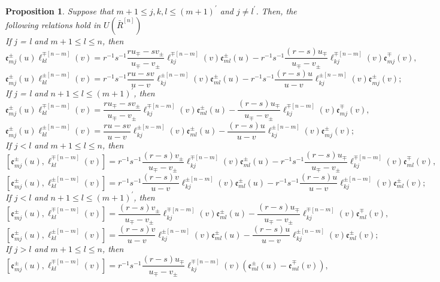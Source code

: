 \documentclass[10pt,a4paper]{amsart}
\newtheorem{proposition}[theorem]{Proposition}
\numberwithin{equation}{section}
\begin{document}
	\begin{proposition}	
		Suppose that $m+1 \leqslant j, k, l \leqslant(m+1)^{\prime}$ and $j \neq l^{\prime}$. Then, the following relations hold in $U\left(\bar{R}^{[n]}\right)$\\
		If j = l and $m+1 \leq l \leq n$, then
		$$
		\mathfrak{e}_{m j}^{ \pm}(u) \ell_{k l}^{\mp[n-m]}(v)=r^{-1} s^{-1} \frac{r u_{\mp}-s v_{ \pm}}{u_{\mp}-v_{ \pm}} \ell_{k j}^{\mp[n-m]}(v) \mathfrak{e}_{m l}^{ \pm}(u)-r^{-1} s^{-1} \frac{(r-s) u_{\mp}}{u_{\mp}-v_{ \pm}} \ell_{k j}^{\mp[n-m]}(v) \mathfrak{e}_{m j}^{\mp}(v),
		$$
		$$
		\mathfrak{e}_{m j}^{ \pm}(u) \ell_{k l}^{ \pm[n-m]}(v)=r^{-1} s^{-1} \frac{r u-s v}{u-v} \ell_{k j}^{ \pm[n-m]}(v) \mathfrak{e}_{m l}^{ \pm}(u)-r^{-1} s^{-1} \frac{(r-s) u}{u-v} \ell_{k j}^{ \pm[n-m]}(v) \mathfrak{e}_{m j}^{ \pm}(v);
		$$
		If j = l and $n+1 \leq l \leq(m+1)^{\prime}$, then
$$
\mathfrak{e}_{m j}^{ \pm}(u) \ell_{k l}^{\mp[n-m]}(v)=\frac{r u_{\mp}-s v_{ \pm}}{u_{\mp}-v_{ \pm}} \ell_{k j}^{\mp[n-m]}(v) \mathfrak{e}_{m l}^{ \pm}(u)-\frac{(r-s) u_{\mp}}{u_{\mp}-v_{ \pm}} \ell_{k j}^{\mp[n-m]}(v) \mathfrak{e}_{m j}^{\mp}(v),
$$
			$$
	\mathfrak{e}_{m j}^{ \pm}(u) \ell_{k l}^{ \pm[n-m]}(v)= \frac{r u-s v}{u-v} \ell_{k j}^{ \pm[n-m]}(v) \mathfrak{e}_{m l}^{ \pm}(u)- \frac{(r-s) u}{u-v} \ell_{k j}^{ \pm[n-m]}(v) \mathfrak{e}_{m j}^{ \pm}(v);
	$$
		If $j<l$ and $m+1 \leq l \leq n$, then
$$
\left[\mathfrak{e}_{m j}^{ \pm}(u), \ell_{k l}^{\mp[n-m]}(v)\right]=r^{-1} s^{-1} \frac{(r-s) v_{ \pm}}{u_{\mp}-v_{ \pm}} \ell_{k j}^{\mp[n-m]}(v) \mathfrak{e}_{m l}^{ \pm}(u)-r^{-1} s^{-1} \frac{(r-s) u_{\mp}}{u_{\mp}-v_{ \pm}} \ell_{k j}^{\mp[n-m]}(v) \mathfrak{e}_{m l}^{\mp}(v),
$$
	$$
\left[\mathfrak{e}_{m j}^{ \pm}(u), \ell_{k l}^{ \pm[n-m]}(v)\right]=r^{-1}s^{-1}\frac{\left(r-s\right) v}{u-v} \ell_{k j}^{ \pm[n-m]}(v) \mathfrak{e}_{m l}^{ \pm}(u)-r^{-1}s^{-1}\frac{\left(r-s\right) u}{u-v} \ell_{k j}^{ \pm[n-m]}(v) \mathfrak{e}_{m l}^{ \pm}(v);
$$	
	If $j<l$ and $n+1 \leq l \leq(m+1)^{\prime}$, then
	$$
	\left[\mathfrak{e}_{m j}^{ \pm}(u), \ell_{k l}^{\mp[n-m]}(v)\right]=\frac{(r-s) v_{ \pm}}{u_{\mp}-v_{ \pm}} \ell_{k j}^{\mp[n-m]}(v) \mathfrak{e}_{m l}^{ \pm}(u)-\frac{(r-s) u_{\mp}}{u_{\mp}-v_{ \pm}} \ell_{k j}^{\mp[n-m]}(v) \mathfrak{e}_{m l}^{\mp}(v),
	$$
	$$
	\left[\mathfrak{e}_{m j}^{ \pm}(u), \ell_{k l}^{ \pm[n-m]}(v)\right]=\frac{\left(r-s\right) v}{u-v} \ell_{k j}^{ \pm[n-m]}(v) \mathfrak{e}_{m l}^{ \pm}(u)-\frac{\left(r-s\right) u}{u-v} \ell_{k j}^{ \pm[n-m]}(v) \mathfrak{e}_{m l}^{ \pm}(v);
	$$
	If $j>l$ and $m+1 \leq l \leq n$, then
	$$
	\left[\mathfrak{e}_{m j}^{ \pm}(u), \ell_{k l}^{\mp[n-m]}(v)\right]=r^{-1} s^{-1} \frac{(r-s) u_{\mp}}{u_{\mp}-v_{ \pm}} \ell_{k j}^{\mp[n-m]}(v)\left(\mathfrak{e}_{m l}^{ \pm}(u)-\mathfrak{e}_{m l}^{\mp}(v)\right),
$$
\end{proposition}
\end{document}
